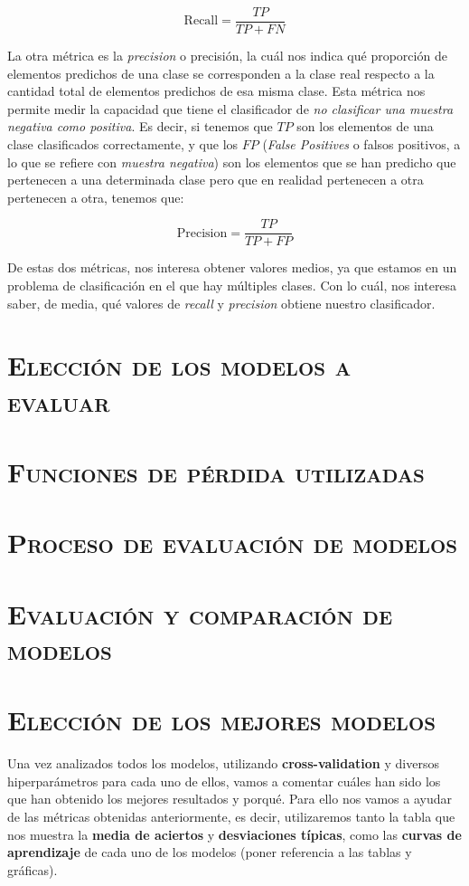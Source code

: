 \documentclass[11pt,a4paper]{article}
\begin{document}
\[ 
\text{Recall} = \frac{TP}{TP + FN}
\]

La otra métrica es la \textit{precision} o precisión, la cuál nos indica qué proporción de elementos predichos de una clase se corresponden
a la clase real respecto a la cantidad total de elementos predichos de esa misma clase. Esta métrica nos permite medir la capacidad que tiene
el clasificador de \textit{no clasificar una muestra negativa como positiva}\cite{bib:precision}. Es decir, si tenemos que $TP$ son los
elementos de una clase clasificados correctamente, y que los $FP$ (\textit{False Positives} o falsos positivos, a lo que se refiere con
\textit{muestra negativa}) son los elementos que se han predicho que pertenecen a una determinada clase pero que en realidad pertenecen a
otra pertenecen a otra, tenemos que:

\[ 
\text{Precision} = \frac{TP}{TP + FP}
\]

De estas dos métricas, nos interesa obtener valores medios, ya que estamos en un problema de clasificación en el que hay múltiples clases.
Con lo cuál, nos interesa saber, de media, qué valores de \textit{recall} y \textit{precision} obtiene nuestro clasificador.

\section{\textsc{Elección de los modelos a evaluar}}

\section{\textsc{Funciones de pérdida utilizadas}}

\section{\textsc{Proceso de evaluación de modelos}}

\section{\textsc{Evaluación y comparación de modelos}}

\newpage

\section{\textsc{Elección de los mejores modelos}}

Una vez analizados todos los modelos, utilizando \textbf{cross-validation} y diversos hiperparámetros para cada uno de ellos, vamos a
comentar cuáles han sido los que han obtenido los mejores resultados y porqué. Para ello nos vamos a ayudar de las métricas obtenidas
anteriormente, es decir, utilizaremos tanto la tabla que nos muestra la \textbf{media de aciertos} y \textbf{desviaciones típicas}, como
las \textbf{curvas de aprendizaje} de cada uno de los modelos (poner referencia a las tablas y gráficas).
\end{document}
